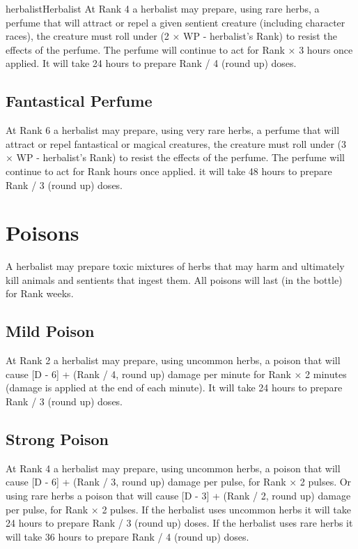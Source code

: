 \begin{Skill}[1.1]{herbalist}{Herbalist}
At Rank 4 a herbalist may prepare, using rare herbs, a perfume that
will attract or repel a given sentient creature (including character
races), the creature must roll under (2 × WP - herbalist’s Rank) to
resist the effects of the perfume.  The perfume will continue to act
for Rank × 3 hours once applied. It will take 24 hours to prepare Rank
/ 4 (round up) doses.

\subsection{Fantastical Perfume}

At Rank 6 a herbalist may prepare, using very rare herbs, a perfume
that will attract or repel fantastical or magical creatures, the
creature must roll under (3 × WP - herbalist’s Rank) to resist the
effects of the perfume.  The perfume will continue to act for Rank
hours once applied. it will take 48 hours to prepare Rank / 3 (round
up) doses.

\section{Poisons}

A herbalist may prepare toxic mixtures of herbs that may harm and
ultimately kill animals and sentients that ingest them. All poisons
will last (in the bottle) for Rank weeks.

\subsection{Mild Poison}

At Rank 2 a herbalist may prepare, using uncommon herbs, a poison that
will cause [D - 6] + (Rank / 4, round up) damage per minute for Rank ×
2 minutes (damage is applied at the end of each minute).  It will take
24 hours to prepare Rank / 3 (round up) doses.

\subsection{Strong Poison}

At Rank 4 a herbalist may prepare, using uncommon herbs, a poison that
will cause [D - 6] + (Rank / 3, round up) damage per pulse, for Rank ×
2 pulses. Or using rare herbs a poison that will cause [D - 3] + (Rank
/ 2, round up) damage per pulse, for Rank × 2 pulses.  If the
herbalist uses uncommon herbs it will take 24 hours to prepare Rank
/ 3 (round up) doses. If the herbalist uses rare herbs it will take 36
hours to prepare Rank / 4 (round up) doses.


\end{Skill}
